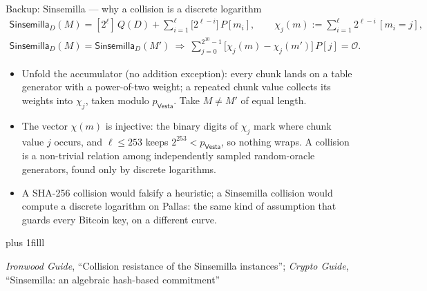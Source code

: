 \documentclass[aspectratio=169,11pt]{beamer}
\newcommand{\Vesta}{\ensuremath{\mathsf{Vesta}}}
\newcommand{\src}[1]{\par\vskip0pt plus 1filll
  {\fontsize{6}{7.2}\selectfont\color{arbdim}\raggedright #1\par}}
\begin{document}
\begin{frame}{Backup: Sinsemilla --- why a collision is a discrete logarithm}
\vspace*{-10pt}
\setlength{\abovedisplayskip}{1pt}\setlength{\belowdisplayskip}{1pt}
\begin{gather*}
\mathsf{Sinsemilla}_D(M) = [2^{\ell}]\, Q(D) + \sum_{i=1}^{\ell}
  \bigl[2^{\ell - i}\bigr]\, P[m_i],
\qquad
\chi_j(m) := \sum_{i=1}^{\ell} 2^{\ell - i}\,[m_i = j],\\
\mathsf{Sinsemilla}_D(M) = \mathsf{Sinsemilla}_D(M') \ \Longrightarrow\
\sum_{j=0}^{2^{10}-1} \bigl[\chi_j(m) - \chi_j(m')\bigr]\, P[j] = \mathcal{O}.
\end{gather*}
\begin{itemize}\small
  \item Unfold the accumulator (no addition exception): every chunk lands
    on a table generator with a power-of-two weight; a repeated chunk
    value collects its weights into $\chi_j$, taken modulo $p_{\Vesta}$.
    Take $M \ne M'$ of equal length.
  \item The vector $\chi(m)$ is injective: the binary digits of $\chi_j$
    mark where chunk value $j$ occurs, and $\ell \le 253$ keeps $2^{253} <
    p_{\Vesta}$, so nothing wraps. A collision is a non-trivial relation
    among independently sampled random-oracle generators, found only by
    discrete logarithms.
  \item A SHA-256 collision would falsify a heuristic; a Sinsemilla
    collision would compute a discrete logarithm on Pallas: the same kind
    of assumption that guards every Bitcoin key, on a different curve.
\end{itemize}
\src{\emph{Ironwood Guide}, ``Collision resistance of the Sinsemilla
instances''; \emph{Crypto Guide}, ``Sinsemilla: an algebraic hash-based
commitment''}
\end{frame}
\end{document}
